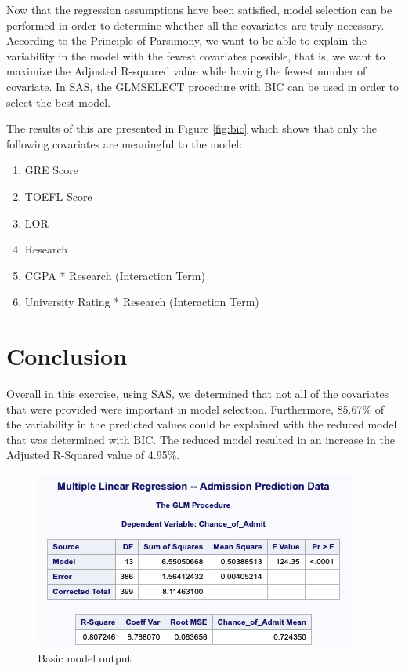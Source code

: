 \documentclass{article}
\begin{document}
Now that the regression assumptions have been satisfied, model selection can be performed in order to determine whether all the covariates are truly necessary. According to the \href{https://www.oxfordreference.com/view/10.1093/oi/authority.20110803100346221}{Principle of Parsimony}, we want to be able to explain the variability in the model with the fewest covariates possible, that is, we want to maximize the Adjusted R-squared value while having the fewest number of covariate. In SAS, the GLMSELECT procedure with BIC can be used in order to select the best model. 

The results of this are presented in Figure \ref{fig:bic} which shows that only the following covariates are meaningful to the model:

\begin{enumerate}

\item GRE Score
\item TOEFL Score
\item LOR
\item Research
\item CGPA * Research (Interaction Term)
\item University Rating * Research (Interaction Term)

\end{enumerate}

\section*{Conclusion}

Overall in this exercise, using SAS, we determined that not all of the covariates that were provided were important in model selection. Furthermore, 85.67\% of the variability in the predicted values could be explained with the reduced model that was determined with BIC. The reduced model resulted in an increase in the Adjusted R-Squared value of 4.95\%. 

\newpage
\begin{figure}[h!]
\includegraphics[scale=1]{basic_model_output.png}
\caption{Basic model output}
\label{fig:basicmodeloutput}
\end{figure}
\end{document}
